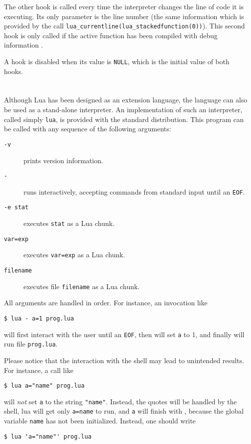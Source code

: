 The other hook is called every time the interpreter changes
the line of code it is executing.
Its only parameter is the line number
(the same information which is provided by the call
\verb'lua_currentline(lua_stackedfunction(0))').
This second hook is only called if the active function
has been compiled with debug information .

A hook is disabled when its value is \verb|NULL|,
which is the initial value of both hooks.



\section{} \label{lua-sa}

Although Lua has been designed as an extension language,
the language can also be used as a stand-alone interpreter.
An implementation of such an interpreter,
called simply \verb|lua|,
is provided with the standard distribution.
This program can be called with any sequence of the following arguments:
\begin{description}
\item[{\tt -v}] prints version information.
\item[{\tt -}] runs interactively, accepting commands from standard input
until an \verb|EOF|.
\item[{\tt -e stat}] executes \verb|stat| as a Lua chunk.
\item[{\tt var=exp}] executes \verb|var=exp| as a Lua chunk.
\item[{\tt filename}] executes file \verb|filename| as a Lua chunk.
\end{description}
All arguments are handled in order.
For instance, an invocation like
\begin{verbatim}
$ lua - a=1 prog.lua
\end{verbatim}
will first interact with the user until an \verb|EOF|,
then will set \verb'a' to 1,
and finally will run file \verb'prog.lua'.

Please notice that the interaction with the shell may lead to
unintended results.
For instance, a call like
\begin{verbatim}
$ lua a="name" prog.lua
\end{verbatim}
will {\em not\/} set \verb|a| to the string \verb|"name"|.
Instead, the quotes will be handled by the shell,
lua will get only \verb'a=name' to run,
and \verb'a' will finish with \nil,
because the global variable \verb|name| has not been initialized.
Instead, one should write
\begin{verbatim}
$ lua 'a="name"' prog.lua
\end{verbatim}

